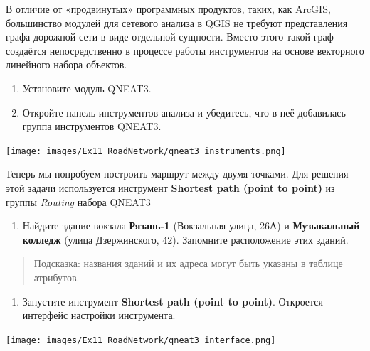 \documentclass[
  12pt,
]{book}
\providecommand{\tightlist}{%
  \setlength{\itemsep}{0pt}\setlength{\parskip}{0pt}}
\begin{document}
В отличие от «продвинутых» программных продуктов, таких, как ArcGIS, большинство модулей для сетевого анализа в QGIS не требуют представления графа дорожной сети в виде отдельной сущности. Вместо этого такой граф создаётся непосредственно в процессе работы инструментов на основе векторного линейного набора объектов.

\begin{enumerate}
\def\labelenumi{\arabic{enumi}.}
\item
  Установите модуль QNEAT3.
\item
  Откройте панель инструментов анализа и убедитесь, что в неё добавилась группа инструментов QNEAT3.
\end{enumerate}

\texttt{[image: images/Ex11\_RoadNetwork/qneat3\_instruments.png]}

Теперь мы попробуем построить маршрут между двумя точками. Для решения этой задачи используется инструмент \textbf{Shortest path (point to point)} из группы \emph{Routing} набора QNEAT3

\begin{enumerate}
\def\labelenumi{\arabic{enumi}.}
\setcounter{enumi}{2}
\tightlist
\item
  Найдите здание вокзала \textbf{Рязань-1} (Вокзальная улица, 26А) и \textbf{Музыкальный колледж} (улица Дзержинского, 42). Запомните расположение этих зданий.
\end{enumerate}

\begin{quote}
Подсказка: названия зданий и их адреса могут быть указаны в таблице атрибутов.
\end{quote}

\begin{enumerate}
\def\labelenumi{\arabic{enumi}.}
\setcounter{enumi}{3}
\tightlist
\item
  Запустите инструмент \textbf{Shortest path (point to point)}. Откроется интерфейс настройки инструмента.
\end{enumerate}

\texttt{[image: images/Ex11\_RoadNetwork/qneat3\_interface.png]}
\end{document}
